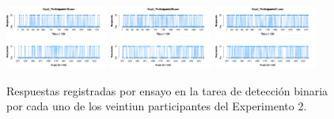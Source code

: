 \documentclass[a4paper ]{article}
\begin{document}
\begin{figure}[th]
\includegraphics[width=0.3\textwidth]{Figures/Response_Exp2_P19} \includegraphics[width=0.3\textwidth]{Figures/Response_Exp2_P20} \includegraphics[width=0.3\textwidth]{Figures/Response_Exp2_P21} 
\caption[Respuesta binaria registrada ensayo a ensayo; Experimento 2]{Respuestas registradas por ensayo en la tarea de detección binaria por cada uno de los veintiun participantes del Experimento 2.}
\label{fig:Response_E2}
\end{figure}
\end{document}
